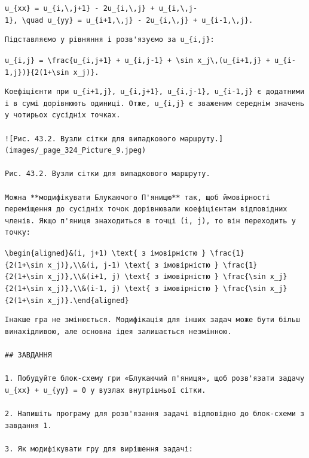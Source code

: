 \documentclass[
  ukrainian,
]{article}
\begin{document}
\texttt{u\_\{xx\}\ =\ u\_\{i,\textbackslash{},j+1\}\ -\ 2u\_\{i,\textbackslash{},j\}\ +\ u\_\{i,\textbackslash{},j-1\},\ \textbackslash{}quad\ u\_\{yy\}\ =\ u\_\{i+1,\textbackslash{},j\}\ -\ 2u\_\{i,\textbackslash{},j\}\ +\ u\_\{i-1,\textbackslash{},j\}.}

\begin{verbatim}
Підставляємо у рівняння і розв'язуємо за u_{i,j}:
\end{verbatim}

\texttt{u\_\{i,j\}\ =\ \textbackslash{}frac\{u\_\{i,j+1\}\ +\ u\_\{i,j-1\}\ +\ \textbackslash{}sin\ x\_j\textbackslash{},(u\_\{i+1,j\}\ +\ u\_\{i-1,j\})\}\{2(1+\textbackslash{}sin\ x\_j)\}.}

\begin{verbatim}
Коефіцієнти при u_{i+1,j}, u_{i,j+1}, u_{i,j-1}, u_{i-1,j} є додатними і в сумі дорівнюють одиниці. Отже, u_{i,j} є зваженим середнім значень у чотирьох сусідніх точках.

![Рис. 43.2. Вузли сітки для випадкового маршруту.](images/_page_324_Picture_9.jpeg)

Рис. 43.2. Вузли сітки для випадкового маршруту.

Можна **модифікувати Блукаючого П'яницю** так, щоб ймовірності переміщення до сусідніх точок дорівнювали коефіцієнтам відповідних членів. Якщо п'яниця знаходиться в точці (i, j), то він переходить у точку:
\end{verbatim}

\texttt{\textbackslash{}begin\{aligned\}\&(i,\ j+1)\ \textbackslash{}text\{\ з\ імовірністю\ \}\ \textbackslash{}frac\{1\}\{2(1+\textbackslash{}sin\ x\_j)\},\textbackslash{}\textbackslash{}\&(i,\ j-1)\ \textbackslash{}text\{\ з\ імовірністю\ \}\ \textbackslash{}frac\{1\}\{2(1+\textbackslash{}sin\ x\_j)\},\textbackslash{}\textbackslash{}\&(i+1,\ j)\ \textbackslash{}text\{\ з\ імовірністю\ \}\ \textbackslash{}frac\{\textbackslash{}sin\ x\_j\}\{2(1+\textbackslash{}sin\ x\_j)\},\textbackslash{}\textbackslash{}\&(i-1,\ j)\ \textbackslash{}text\{\ з\ імовірністю\ \}\ \textbackslash{}frac\{\textbackslash{}sin\ x\_j\}\{2(1+\textbackslash{}sin\ x\_j)\}.\textbackslash{}end\{aligned\}}

\begin{verbatim}
Інакше гра не змінюється. Модифікація для інших задач може бути більш винахідливою, але основна ідея залишається незмінною.

## ЗАВДАННЯ

1. Побудуйте блок-схему гри «Блукаючий п'яниця», щоб розв'язати задачу u_{xx} + u_{yy} = 0 у вузлах внутрішньої сітки.

2. Напишіть програму для розв'язання задачі відповідно до блок-схеми з завдання 1.

3. Як модифікувати гру для вирішення задачі:
\end{verbatim}
\end{document}
